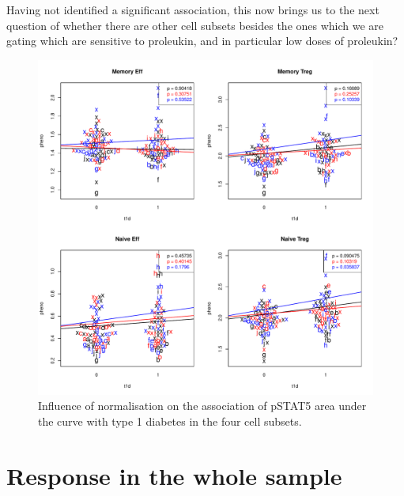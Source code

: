 Having not identified a significant association, this now brings us to the next question of whether there are other
cell subsets besides the ones which we are gating which are sensitive to proleukin, and in particular low doses of proleukin?


\begin{figure}[h]
    \centering
    \includegraphics[scale=.5]{IL2/figures/pstat5-auc-t1d-celltypes.pdf}
    { Influence of normalisation on the association of pSTAT5 area under the curve with type 1 diabetes in the four cell subsets. }
    { }
\end{figure}



\section{Response in the whole sample}

